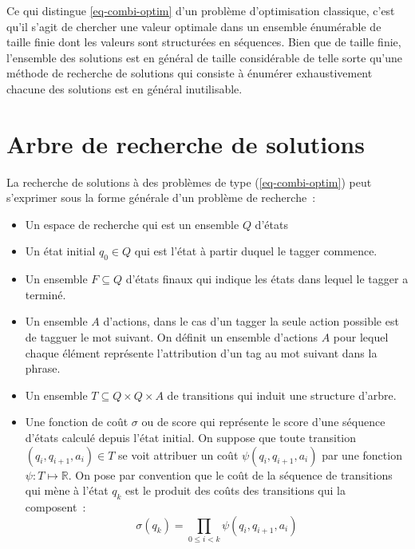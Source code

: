\documentclass[11pt,openany]{book}
\begin{document}
Ce qui distingue \ref{eq-combi-optim} d'un problème d'optimisation classique,
c'est qu'il s'agit de chercher une valeur optimale dans un ensemble énumérable de taille finie dont les valeurs sont structurées en séquences.
Bien que de taille finie, l'ensemble des solutions est en général de taille considérable de telle sorte qu'une méthode de recherche de solutions qui consiste à énumérer exhaustivement chacune des solutions est en général inutilisable.


\section{Arbre de recherche de solutions}

La recherche de solutions à des problèmes de type (\ref{eq-combi-optim}) 
peut s'exprimer sous la forme générale d'un problème de recherche~:
\begin{itemize}
\item Un espace de recherche qui est un ensemble $Q$ d'états
\item Un état initial $q_0 \in Q$ qui est l'état à partir duquel le tagger commence.    
\item Un ensemble $F\subseteq Q$ d'états finaux qui indique les états dans lequel le tagger a terminé.
\item Un ensemble $A$ d'actions, dans le cas d'un tagger la seule action possible est de tagguer le mot suivant. On définit un ensemble d'actions $A$ pour lequel chaque élément représente l'attribution d'un tag au mot suivant dans la phrase.
\item Un ensemble $T\subseteq Q\times Q \times A$ de transitions qui induit une structure d'arbre.
\item Une fonction de coût $\sigma$ ou de score qui représente le score d'une séquence d'états calculé depuis l'état initial. On suppose que toute transition  $(q_i,q_{i+1},a_i) \in T$ se voit attribuer un coût $\psi(q_i,q_{i+1},a_i)$ par une fonction $\psi: T \mapsto \mathbb{R}$. On pose par convention que le coût de la séquence de transitions qui mène à l'état $q_k$ est le produit des coûts des transitions qui la composent~: 
\begin{displaymath}
\sigma(q_k) = \prod_{0\leq i < k} \psi(q_i,q_{i+1},a_i)
\end{displaymath}
\end{itemize}
\end{document}
